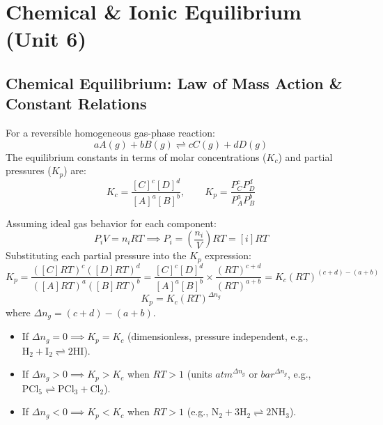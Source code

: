 \documentclass[10pt,twoside,openright]{book}
\begin{document}
\section{Chemical \& Ionic Equilibrium (Unit 6)}

\subsection{Chemical Equilibrium: Law of Mass Action \& Constant Relations}
For a reversible homogeneous gas-phase reaction:
\begin{equation}
  aA(g) + bB(g) \rightleftharpoons cC(g) + dD(g)
\end{equation}
The equilibrium constants in terms of molar concentrations ($K_c$) and partial pressures ($K_p$) are:
\begin{equation}
  K_c = \frac{[C]^c [D]^d}{[A]^a [B]^b}, \qquad K_p = \frac{P_C^c P_D^d}{P_A^a P_B^b}
\end{equation}

\begin{formulabox}[Derivation of $K_p = K_c(R T)^{\Delta n_g}$]
Assuming ideal gas behavior for each component:
\begin{equation}
  P_i V = n_i R T \implies P_i = \left(\frac{n_i}{V}\right) R T = [i] R T
\end{equation}
Substituting each partial pressure into the $K_p$ expression:
\begin{equation}
  K_p = \frac{([C] R T)^c ([D] R T)^d}{([A] R T)^a ([B] R T)^b} = \frac{[C]^c [D]^d}{[A]^a [B]^b} \times \frac{(R T)^{c+d}}{(R T)^{a+b}} = K_c (R T)^{(c+d) - (a+b)}
\end{equation}
\begin{equation}
  K_p = K_c (R T)^{\Delta n_g}
\end{equation}
where $\Delta n_g = (c + d) - (a + b)$.
\begin{itemize}
  \item If $\Delta n_g = 0 \implies K_p = K_c$ (dimensionless, pressure independent, e.g., $\mathrm{H_2 + I_2 \rightleftharpoons 2HI}$).
  \item If $\Delta n_g > 0 \implies K_p > K_c$ when $R T > 1$ (units $\si{atm^{\Delta n_g}}$ or $\si{bar^{\Delta n_g}}$, e.g., $\mathrm{PCl_5 \rightleftharpoons PCl_3 + Cl_2}$).
  \item If $\Delta n_g < 0 \implies K_p < K_c$ when $R T > 1$ (e.g., $\mathrm{N_2 + 3H_2 \rightleftharpoons 2NH_3}$).
\end{itemize}
\end{formulabox}
\end{document}
